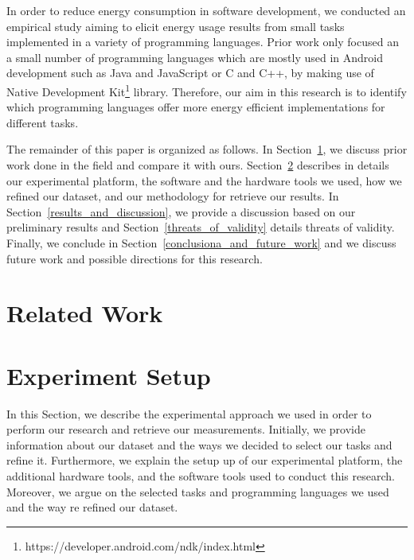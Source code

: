 In order to reduce energy consumption in software development, 
we conducted an empirical study aiming to elicit energy usage 
results from small tasks implemented in a variety of 
programming languages.
Prior work only focused an a small number of programming languages 
which are mostly used in Android development such as Java and 
JavaScript or C and  C++, by making use of Native Development Kit\footnote{https://developer.android.com/ndk/index.html} library.
Therefore, our aim in this research is to identify which 
programming languages offer more energy efficient implementations 
for different tasks.


The remainder of this paper is organized as follows.
In Section~\ref{related_work}, we discuss prior work done in the 
field and compare it with ours. 
Section~\ref{experiment_setup} describes in details our experimental 
platform, the software and the hardware tools we used, how we 
refined our dataset, and our methodology for retrieve our results. 
In Section~\ref{results_and_discussion}, we provide a discussion 
based on our preliminary results and Section~\ref{threats_of_validity} 
details threats of validity.
Finally, we conclude in Section~\ref{conclusiona_and_future_work} 
and we discuss future work and possible directions for this 
research.


\section{Related Work} \label{related_work}

\section{Experiment Setup} \label{experiment_setup}
In this Section, we describe the experimental approach we 
used in order to perform our research and retrieve our 
measurements. 
Initially, we provide information about our dataset 
and the ways we decided to select our tasks and 
refine it.
Furthermore, we explain the setup up of our experimental 
platform, the additional hardware tools, and the software 
tools used to conduct this research. 
Moreover, we argue on the selected tasks and programming 
languages we used and the way re refined our dataset.

